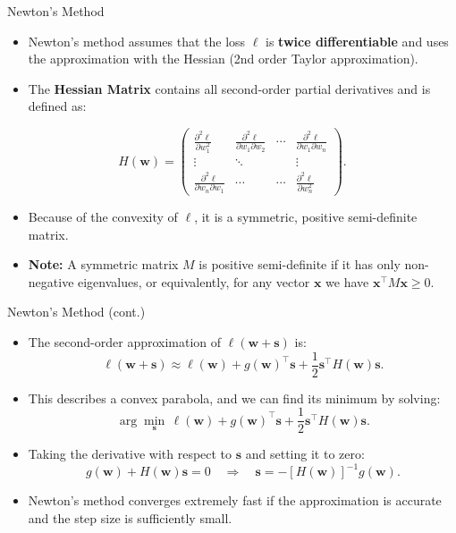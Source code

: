 \documentclass[serif, aspectratio=169]{beamer}
\begin{document}
\begin{frame}{Newton's Method}
    \begin{itemize}
        \item Newton's method assumes that the loss $\ell$ is \textbf{twice differentiable}
        and uses the approximation with the Hessian (2nd order Taylor approximation).
        \item The \textbf{Hessian Matrix} contains all second-order partial derivatives and is defined as:
    \end{itemize}

    \[
    H(\mathbf{w}) =
    \begin{pmatrix}
        \frac{\partial^2 \ell}{\partial w_1^2} & \frac{\partial^2 \ell}{\partial w_1 \partial w_2} & \cdots & \frac{\partial^2 \ell}{\partial w_1 \partial w_n} \\
        \vdots & \ddots & & \vdots \\
        \frac{\partial^2 \ell}{\partial w_n \partial w_1} & \cdots & \cdots & \frac{\partial^2 \ell}{\partial w_n^2}
    \end{pmatrix}.
    \]

    \begin{itemize}
        \item Because of the convexity of $\ell$, it is a symmetric, positive semi-definite matrix.
        \item \textbf{Note:} A symmetric matrix $M$ is positive semi-definite if it has only non-negative eigenvalues, or equivalently,
        for any vector $\mathbf{x}$ we have $\mathbf{x}^{\top}M\mathbf{x} \ge 0$.
    \end{itemize}
\end{frame}


\begin{frame}{Newton's Method (cont.)}
    \begin{itemize}
        \item The second-order approximation of $\ell(\mathbf{w} + \mathbf{s})$ is:
        \[
        \ell(\mathbf{w} + \mathbf{s}) \approx \ell(\mathbf{w}) + g(\mathbf{w})^{\top} \mathbf{s} + \frac{1}{2}\mathbf{s}^{\top} H(\mathbf{w})\mathbf{s}.
        \]
        \item This describes a convex parabola, and we can find its minimum by solving:
        \[
        \arg\min_{\mathbf{s}} \, \ell(\mathbf{w}) + g(\mathbf{w})^{\top}\mathbf{s} + \frac{1}{2}\mathbf{s}^{\top} H(\mathbf{w})\mathbf{s}.
        \]
        \item Taking the derivative with respect to $\mathbf{s}$ and setting it to zero:
        \[
        g(\mathbf{w}) + H(\mathbf{w})\mathbf{s} = 0
        \quad \Rightarrow \quad
        \mathbf{s} = -[H(\mathbf{w})]^{-1} g(\mathbf{w}).
        \]
        \item Newton’s method converges extremely fast if the approximation is accurate
        and the step size is sufficiently small.
    \end{itemize}
\end{frame}
\end{document}

